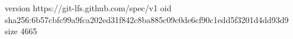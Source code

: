 version https://git-lfs.github.com/spec/v1
oid sha256:6b57cbfc99a9fca202ed31f842c8ba885c09c0de6cf90c1edd5f3201d4dd93d9
size 4665
